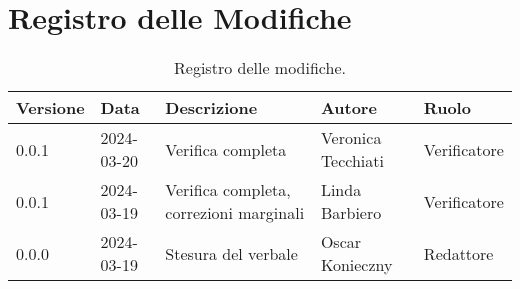 \section*{Registro delle Modifiche}
\begin{table}[ht!]	
		\centering
		\begin{tabular}{p{1.2cm} p{2cm} p{6cm} p{3cm} p{2cm}}
			\toprule
			\textbf{Versione}& \textbf{Data} & \textbf{Descrizione} & \textbf{Autore} & \textbf{Ruolo} \\
			\midrule
			0.0.1 & 2024-03-20 & Verifica completa & Veronica Tecchiati & Verificatore \\
			0.0.1 & 2024-03-19 & Verifica completa, correzioni marginali  & Linda Barbiero & Verificatore \\
			0.0.0 & 2024-03-19 & Stesura del verbale  & Oscar Konieczny & Redattore \\
			\bottomrule
		\end{tabular}
		\caption{Registro delle modifiche.}
		\label{table:Registro delle modifiche}
\end{table}
